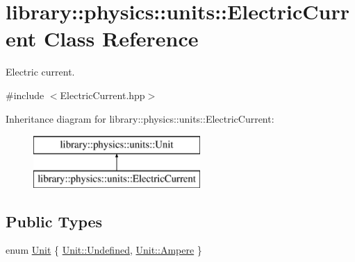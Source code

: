 \hypertarget{classlibrary_1_1physics_1_1units_1_1_electric_current}{}\section{library\+:\+:physics\+:\+:units\+:\+:Electric\+Current Class Reference}
\label{classlibrary_1_1physics_1_1units_1_1_electric_current}


Electric current.  




{\ttfamily \#include $<$Electric\+Current.\+hpp$>$}

Inheritance diagram for library\+:\+:physics\+:\+:units\+:\+:Electric\+Current\+:\begin{figure}[H]
\begin{center}
\leavevmode
\includegraphics[height=2.000000cm]{classlibrary_1_1physics_1_1units_1_1_electric_current}
\end{center}
\end{figure}
\subsection*{Public Types}
\begin{DoxyCompactItemize}
\item 
enum \hyperlink{classlibrary_1_1physics_1_1units_1_1_electric_current_a9498eabf964f0ae6116eb627b4ec5233}{Unit} \{ \hyperlink{classlibrary_1_1physics_1_1units_1_1_electric_current_a9498eabf964f0ae6116eb627b4ec5233aec0fc0100c4fc1ce4eea230c3dc10360}{Unit\+::\+Undefined}, 
\hyperlink{classlibrary_1_1physics_1_1units_1_1_electric_current_a9498eabf964f0ae6116eb627b4ec5233a2ee3b9f6a94ce5398d1386f42f9c87ac}{Unit\+::\+Ampere}
 \}
\end{DoxyCompactItemize}
